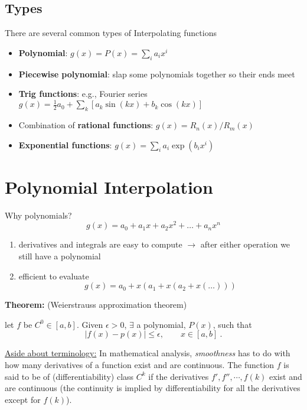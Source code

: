 \documentclass[12pt]{article}
\begin{document}
\subsection*{Types}
There are several common types of Interpolating functions
%
\begin{itemize}
\item \textbf{Polynomial}: $g(x) = P(x) = \sum_i a_i x^i$

\item \textbf{Piecewise polynomial}: slap some polynomials together so their ends meet

\item \textbf{Trig functions}: e.g., Fourier series $g(x) = \frac{1}{2} a_0 + \sum_k [a_k \sin(kx) + b_k \cos(kx)]$ %

\item Combination of \textbf{rational functions}: $g(x) = R_n(x)/R_m(x)$

\item \textbf{Exponential functions}: $g(x) = \sum_i a_i \exp(b_i x^i)$
\end{itemize}


\section*{Polynomial Interpolation}
Why polynomials?
\[g(x) = a_0 + a_1 x + a_2 x^2 + \dots +a_n x^n\]

\begin{enumerate}
\item derivatives and integrals are easy to compute $\rightarrow$ after either operation we still have a polynomial
\item efficient to evaluate
\[g(x) = a_0 + x(a_1 + x(a_2 + x(\dots)))\]
\end{enumerate}

\textbf{Theorem:} (Weierstrauss approximation theorem)

let $f$ be $C^0 \in [a,b]$. Given $\epsilon > 0$, $\exists$ a polynomial, $P(x)$, such that 
\[|f(x) - p(x)| \leq \epsilon, \qquad x \in [a,b] \:.\]


\begin{addmargin}[3em]{1em}
\underline{Aside about terminology:} In mathematical analysis, \textit{smoothness} has to do with how many derivatives of a function exist and are continuous. The function $f$ is said to be of (differentiability) class $C^k$ if the derivatives $f', f'', \cdots, f(k)$ exist and are continuous (the continuity is implied by differentiability for all the derivatives except for $f(k)$). 
\end{addmargin}%
\end{document}
